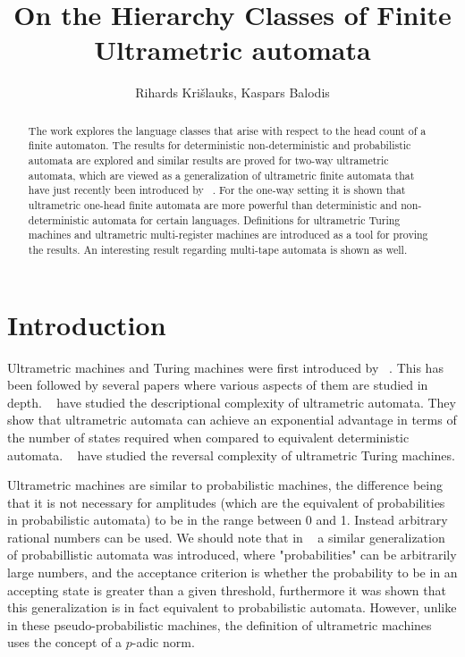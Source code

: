 \documentclass{llncs}
\begin{document}
\title{On the Hierarchy Classes of Finite Ultrametric automata}


\author{
Rihards Kri\v slauks, Kaspars Balodis}

\maketitle

\begin{abstract}
The work explores the language classes that arise with respect to the head count of a finite automaton. The results for deterministic non-deterministic and probabilistic automata are explored and similar results are proved for two-way ultrametric automata, which are viewed as a generalization of ultrametric finite automata that have just recently been introduced by ~\citet{Freivalds2012}. For the one-way setting it is shown that ultrametric one-head finite automata are more powerful than deterministic and non-deterministic automata for certain languages. Definitions for ultrametric Turing machines and ultrametric multi-register machines are introduced as a tool for proving the results. An interesting result regarding multi-tape automata is shown as well.
\end{abstract}



\section{Introduction} 
Ultrametric machines and Turing machines were first introduced by ~\citep{Freivalds2012}. This has been followed by several papers where various aspects of them are studied in depth. ~\citep{ KasparsBalodis2013} have studied the descriptional complexity of ultrametric automata. They show that ultrametric automata can achieve an exponential advantage in terms of the number of states required when compared to equivalent deterministic automata. ~\citep{Krislauks2013} have studied the reversal complexity of ultrametric Turing machines.

Ultrametric machines are similar to probabilistic machines, the difference being that it is not necessary for amplitudes (which are the equivalent of probabilities in probabilistic automata) to be in the range between 0 and 1. Instead arbitrary rational numbers can be used. We should note that in ~\citep{Turakainen1969} a similar generalization of probabillistic automata was introduced, where "probabilities" can be arbitrarily large numbers, and the acceptance criterion is whether the probability to be in an accepting state is greater than a given threshold, furthermore it was shown that this generalization is in fact equivalent to probabilistic automata. However, unlike in these pseudo-probabilistic machines, the definition of ultrametric machines uses the concept of a $p$-adic norm.
\end{document}
